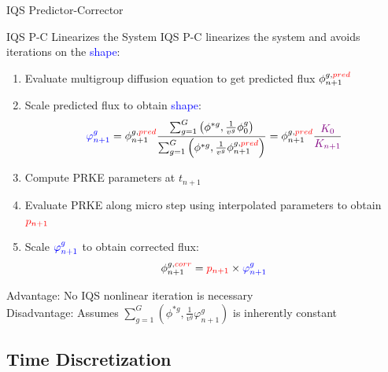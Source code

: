 \documentclass[8pt,xcolor=dvipnames]{beamer}
\newcommand{\ben}{\begin{enumerate}}
\newcommand{\een}{\end{enumerate}}
\newcommand{\tcr}[1]{\textcolor{red}{#1}}
\newcommand{\tcb}[1]{\textcolor{blue}{#1}}
\newcommand{\tcp}[1]{\textcolor{violet}{#1}}
\begin{document}
\begin{frame}{IQS Predictor-Corrector}

\begin{block}{IQS P-C Linearizes the System}
IQS P-C linearizes the system and avoids iterations on the \tcb{shape}: 
\ben
\item Evaluate multigroup diffusion equation to get predicted flux $\phi_{n+1}^{g,\tcr{pred}}$
\item Scale predicted flux to obtain \tcb{shape}:
\[
\tcb{\varphi^{g}_{n+1}} = \phi_{n+1}^{g,\tcr{pred}} \frac{\sum_{g=1}^G\left(\phi^{*g},\frac{1}{v^g}\phi ^g_{0}\right)}{\sum_{g=1}^G \left(\phi^{*g},\frac{1}{v^g}\phi_{n+1}^{g,\tcr{pred}}\right)} = \phi_{n+1}^{g,\tcr{pred}} \frac{\tcp{K_0}}{\tcp{K_{n+1}}}
\]
\item Compute PRKE parameters at $t_{n+1}$
\item Evaluate PRKE along micro step using interpolated parameters to obtain $\tcr{p_{n+1}}$
\item Scale $\tcb{\varphi^{g}_{n+1}}$ to obtain corrected flux:
\[
\phi_{n+1}^{g,\tcr{corr}} = \tcr{p_{n+1}} \times \tcb{\varphi^{g}_{n+1}}
\]
\een

 Advantage: No IQS nonlinear iteration is necessary \\
 Disadvantage: Assumes $\sum_{g=1}^G\left(\phi^{*g},\frac{1}{v^g}\varphi^g_{n+1}\right)$ is inherently constant \\
\end{block}

\end{frame}

\subsection{Time Discretization}
\end{document}
